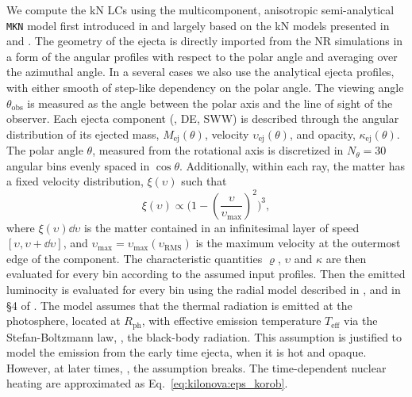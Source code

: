We compute the \ac{kN} \acp{LC} using the multicomponent, anisotropic semi-analytical 
\texttt{MKN} model first introduced in \citet{Perego:2017wtu} and largely based on the 
\ac{kN} models presented in \citet{Grossman:2013lqa} and \citet{Martin:2015hxa}.
%
The geometry of the ejecta is directly imported from the 
\ac{NR} simulations in a form of the angular profiles with 
respect to the polar angle and averaging over the azimuthal angle.
In a several cases we also use the analytical ejecta profiles, with 
either smooth of step-like dependency on the polar angle.
%
The viewing angle $\theta_{\text{obs}}$ is measured as the angle between the 
polar axis and the line of sight of the observer.
Each ejecta component (\eg, \ac{DE}, \ac{SWW}) is described through 
the angular distribution of its ejected mass, $M_{\text{ej}}(\theta)$, 
velocity $\upsilon_{\text{ej}}(\theta)$,
and opacity, $\kappa_{\text{ej}}(\theta)$.
%
The polar angle $\theta$, measured from the rotational axis is discretized in 
$N_\theta=30$ angular bins evenly spaced in $\cos{\theta}$.
%
Additionally, within each ray, the matter 
has a fixed velocity distribution, $\xi(\upsilon)$ such that 
\begin{equation}
\xi(\upsilon) \propto \Big(1 - \left(\frac{\upsilon}{\upsilon_{\text{max}}}\right)^{2}\Big)^{3}, 
\end{equation}
where $\xi(\upsilon) \dd \upsilon$ is the matter contained in an infinitesimal layer of speed 
$\left[\upsilon,\upsilon+\dd \upsilon\right]$, and 
$\upsilon_{\text{max}}=\upsilon_{\text{max}}(\upsilon_{\text{RMS}})$ 
is the maximum velocity at the outermost edge of the component.
%
The characteristic quantities $\varrho$, $\upsilon$ and $\kappa$ are then evaluated 
for every bin according to the assumed input profiles.
Then the emitted luminocity is evaluated for every bin 
using the radial model described in \citet{Perego:2017wtu}, and in 
\S{4} of \citet{Barbieri:2019kli}.
%
The model assumes that the thermal radiation is emitted at the photosphere, located at 
$R_{\text{ph}}$, with effective emission temperature $T_{\text{eff}}$ via the 
Stefan-Boltzmann law, \ie, the black-body radiation. This assumption is justified to 
model the emission from the early time ejecta, when it is hot and opaque. However, at later 
times, , the assumption breaks.
%
The time-dependent nuclear heating are approximated as Eq.~\eqref{eq:kilonova:eps_korob}.
